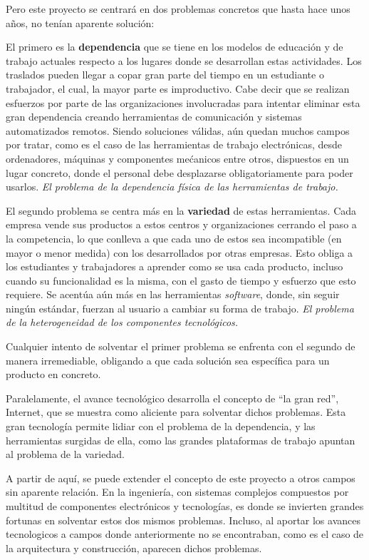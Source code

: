 Pero este proyecto se centrará en dos problemas concretos que hasta hace 
unos años, no tenían aparente solución:

El primero es la \textbf{dependencia} que se tiene en los modelos de educación 
y de trabajo actuales respecto a los lugares donde se desarrollan 
estas actividades. Los traslados pueden llegar a copar gran parte del 
tiempo en un estudiante o trabajador, el cual, la mayor parte es 
improductivo. Cabe decir que se realizan esfuerzos por parte de las 
organizaciones involucradas para intentar eliminar esta gran 
dependencia creando herramientas de comunicación y sistemas 
automatizados remotos. Siendo soluciones válidas, aún quedan muchos 
campos por tratar, como es el caso de las herramientas de trabajo 
electrónicas, desde ordenadores, máquinas y componentes mećanicos 
entre otros, dispuestos en un lugar concreto, donde el personal debe 
desplazarse obligatoriamente para poder usarlos. \emph{El problema de 
la dependencia física de las herramientas de trabajo.}

El segundo problema se centra más en la \textbf{variedad} de estas 
herramientas. Cada empresa vende sus productos a estos centros y 
organizaciones cerrando el paso a la competencia, lo que conlleva a 
que cada uno de estos sea incompatible (en mayor o menor medida) con 
los desarrollados por otras empresas. Esto obliga a los estudiantes y 
trabajadores a aprender como se usa cada producto, incluso cuando su 
funcionalidad es la misma, con el gasto de tiempo y esfuerzo que esto 
requiere. Se acentúa aún más en las herramientas \emph{software}, 
donde, sin seguir ningún estándar, fuerzan al usuario a cambiar su 
forma de trabajo. \emph{El problema de la heterogeneidad de los 
componentes tecnológicos.}

Cualquier intento de solventar el primer problema se enfrenta con el 
segundo de manera irremediable, obligando a que cada solución sea 
específica para un producto en concreto.

Paralelamente, el avance tecnológico desarrolla el concepto de 
``la gran red'', Internet, que se muestra como aliciente para 
solventar dichos problemas. Esta gran tecnología permite lidiar con el 
problema de la dependencia, y las herramientas surgidas de ella, como 
las grandes plataformas de trabajo apuntan al problema de la variedad.

A partir de aquí, se puede extender el concepto de este proyecto a 
otros campos sin aparente relación. En la ingeniería, con sistemas 
complejos compuestos por multitud de componentes electrónicos y 
tecnologías, es donde se invierten grandes fortunas en solventar estos 
dos mismos problemas. Incluso, al aportar los avances tecnologicos a 
campos donde anteriormente no se encontraban, como es el caso de la 
arquitectura y construcción, aparecen dichos problemas.

